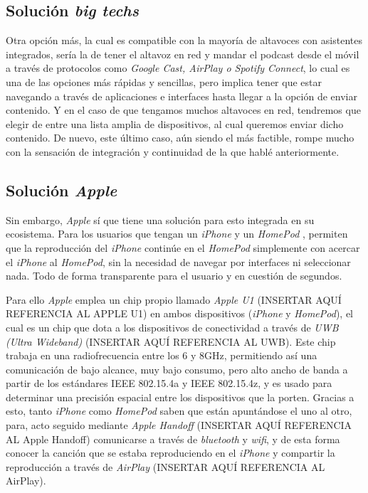 \subsection{Solución \emph{big techs}}
Otra opción más, la cual es compatible con la mayoría de altavoces con
asistentes integrados, sería la de tener el altavoz en red y mandar el podcast
desde el móvil a través de protocolos como \emph{Google Cast, AirPlay o Spotify
Connect}, lo cual es una de las opciones más rápidas y sencillas, pero implica
tener que estar navegando a través de aplicaciones e interfaces hasta llegar a
la opción de enviar contenido. Y en el caso de que tengamos muchos altavoces en
red, tendremos que elegir de entre una lista amplia de dispositivos, al cual
queremos enviar dicho contenido. De nuevo, este último caso, aún siendo el más
factible, rompe mucho con la sensación de integración y continuidad de la que
hablé anteriormente. 

\subsection{Solución \emph{Apple}} Sin embargo, \emph{Apple} sí que tiene una
solución para esto integrada en su ecosistema. Para los usuarios que tengan un
\emph{iPhone} y un \emph{HomePod} \cite{HomePod}, permiten que la reproducción
del \emph{iPhone} continúe en el \emph{HomePod} simplemente con acercar el
\emph{iPhone} al \emph{HomePod}, sin la necesidad de navegar por interfaces ni
seleccionar nada. Todo de forma transparente para el usuario y en cuestión de
segundos. 

Para ello \emph{Apple} emplea un chip propio llamado \emph{Apple U1} (INSERTAR
AQUÍ REFERENCIA AL APPLE U1) en ambos dispositivos (\emph{iPhone} y
\emph{HomePod}), el cual es un chip que dota a los dispositivos de conectividad
a través de \emph{UWB (Ultra Wideband)} (INSERTAR AQUÍ REFERENCIA AL UWB). Este
chip trabaja en una radiofrecuencia entre los 6 y 8GHz, permitiendo así una
comunicación de bajo alcance, muy bajo consumo, pero alto ancho de banda a
partir de los estándares IEEE 802.15.4a y IEEE 802.15.4z, y es usado para
determinar una precisión espacial entre los dispositivos que la porten. Gracias
a esto, tanto \emph{iPhone} como \emph{HomePod} saben que están apuntándose el
uno al otro, para, acto seguido mediante \emph{Apple Handoff} (INSERTAR AQUÍ
REFERENCIA AL Apple Handoff) comunicarse a través de \emph{bluetooth} y
\emph{wifi}, y de esta forma conocer la canción que se estaba reproduciendo en
el \emph{iPhone} y compartir la reproducción a través de \emph{AirPlay}
(INSERTAR AQUÍ REFERENCIA AL AirPlay).

